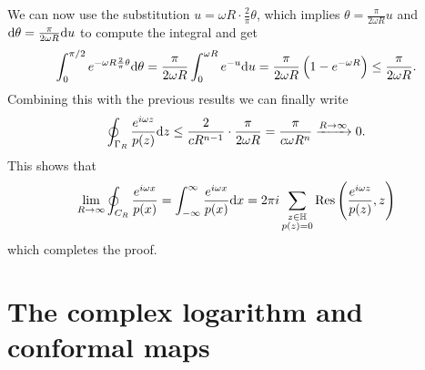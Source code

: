 \documentclass[11pt,a4paper]{article}
\begin{document}
\begin{solution}
\begin{enumerate}
\[    \]
    We can now use the substitution $u = \omega R \cdot \frac{2}{\pi} \theta$,
    which implies $\theta = \frac{\pi}{2 \omega R} u$ and
    $\mathrm{d} \theta = \frac{\pi}{2 \omega R} \mathrm{d} u$ to compute the integral and get
    \[
      \int_{0}^{\pi / 2} e^{- \omega R \frac{2}{\pi} \theta} \dtheta =
      \frac{\pi}{2 \omega R} 
      \int_{0}^{\omega R} e^{-u} \du =
      \frac{\pi}{2 \omega R} \del{1 - e^{- \omega R}} \le
      \frac{\pi}{2 \omega R}.
    \]
    Combining this with the previous results we can finally write
    \[
      \oint_{\Gamma_R} \frac{e^{i \omega z}}{p(z)} \mathrm{d} z \le
      \frac{2}{c R^{n-1}} \cdot \frac{\pi}{2 \omega R} =
      \frac{\pi}{c \omega R^{n}} \xrightarrow{R \to \infty} 0.
    \]
    This shows that
    \[
      \lim_{R \to \infty} \oint_{C_R} \frac{e^{i \omega x}}{p(x)} =
      \int_{\ninfty}^{\infty} \frac{e^{i \omega x}}{p(x)} \dx =
      2 \pi i
      \sum_{\substack{z \in \mathbb H \\ p(z) = 0}}
      \Res\del{\frac{e^{i \omega z}}{p(z)},z}
    \]
    which completes the proof.
\end{enumerate}
\end{solution}

\newpage
\section{The complex logarithm and conformal maps}
\end{document}
